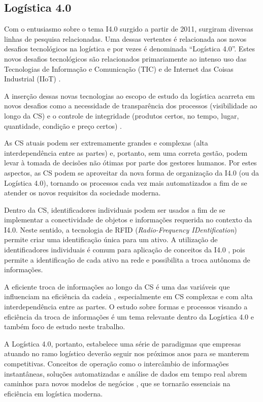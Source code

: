 \subsection{Logística 4.0}

Com o entusiasmo sobre o tema I4.0 surgido a partir de 2011, surgiram diversas linhas de pesquisa relacionadas. Uma dessas vertentes é relacionada aos novos desafios tecnológicos na logística e por vezes é denominada ``Logística 4.0''. Estes novos desafios tecnológicos são relacionados primariamente ao intenso uso das Tecnologias de Informação e Comunicação (TIC) e de Internet das Coisas Industrial (IIoT) \cite{barreto2017industry}.

A inserção dessas novas tecnologias ao escopo de estudo da logística acarreta em novos desafios como a necessidade de transparência dos processos (visibilidade ao longo da CS) e o controle de integridade (produtos certos, no tempo, lugar, quantidade, condição e preço certos) \cite{barreto2017industry}.

As CS atuais podem ser extremamente grandes e complexas (alta interdependência entre as partes) e, portanto, sem uma correta gestão, podem levar à tomada de decisões não ótimas por parte dos gestores humanos. Por estes aspectos, as CS podem se aproveitar da nova forma de organização da I4.0 (ou da Logística 4.0), tornando os processos cada vez mais automatizados a fim de se atender os novos requisitos da sociedade moderna.

Dentro da CS, identificadores individuais podem ser usados a fim de se implementar a conectividade de objetos e informações requerida no contexto da I4.0. Neste sentido, a tecnologia de RFID (\textit{Radio-Frequency IDentification}) permite criar uma identificação única para um ativo. A utilização de identificadores individuais é comum para aplicação de conceitos da I4.0 \cite{alyahya2016rfidwarehousing, vlachos2014rfidimpact, fan2015inventory, bibi2017rfidfood}, pois permite a identificação de cada ativo na rede e possibilita a troca autônoma de informações.

A eficiente troca de informações ao longo da CS é uma das variáveis que influenciam na eficiência da cadeia \cite{barreto2017industry}, especialmente em CS complexas e com alta interdependência entre as partes. O estudo sobre formas e processos visando a eficiência da troca de informações é um tema relevante dentro da Logística 4.0 e também foco de estudo neste trabalho.

A Logística 4.0, portanto, estabelece uma série de paradigmas que empresas atuando no ramo logístico deverão seguir nos próximos anos para se manterem competitivas. Conceitos de operação como o intercâmbio de informações instantâneas, soluções automatizadas e análise de dados em tempo real abrem caminhos para novos modelos de negócios \cite{strandhagen2017logistics}, que se tornarão essenciais na eficiência em logística moderna.

